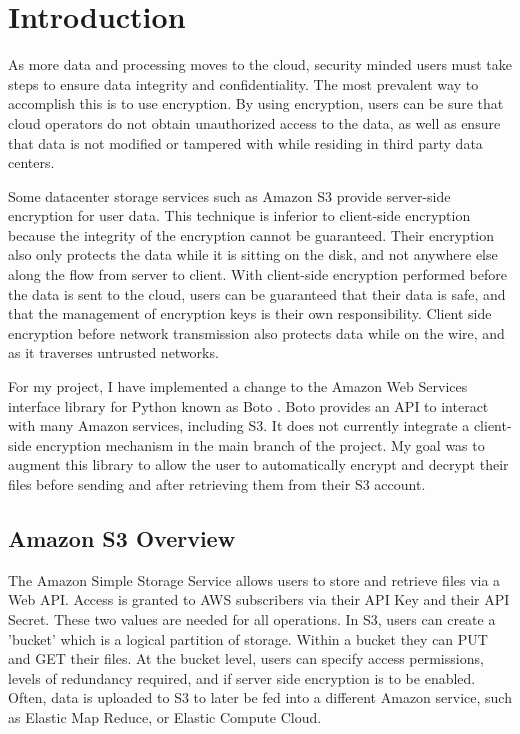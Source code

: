 \section{Introduction}
As more data and processing moves to the cloud, security minded users must take steps to ensure data integrity and confidentiality.
The most prevalent way to accomplish this is to use encryption. 
By using encryption, users can be sure that cloud operators do not
obtain unauthorized access to the data, as well as ensure that data is not modified or tampered with while residing in third party data centers.

Some datacenter storage services such as Amazon S3 \cite{amazons3} provide server-side encryption for user data. This technique is inferior to client-side encryption because the integrity of the encryption cannot be guaranteed.
Their encryption also only protects the data while it is sitting on the disk, and not anywhere else along the flow from server to client.
With client-side encryption performed before the data is sent to the cloud, users can be guaranteed that their data is safe, and that the management of encryption keys is their own responsibility. 
Client side encryption before network transmission also protects data while on the wire, and as it traverses untrusted networks.

For my project, I have implemented a change to the Amazon Web Services interface library for Python known as Boto \cite{boto}. 
Boto provides an API to interact with many Amazon services, including S3. 
It does not currently integrate a client-side encryption mechanism in the main branch of the project. 
My goal was to augment this library to allow the user to automatically encrypt and decrypt their files before sending and 
after retrieving them from their S3 account.

\subsection{Amazon S3 Overview}
The Amazon Simple Storage Service allows users to store and retrieve files via a Web API. Access is granted to AWS subscribers via their API Key and their API Secret. These two values are needed for all operations. In S3, users can create a 'bucket' which is a logical partition of storage. Within a bucket they can PUT and GET their files. At the bucket level, users can specify access permissions, levels of redundancy required, and if server side encryption is to be enabled. Often, data is uploaded to S3 to later be fed into a different Amazon service, such as Elastic Map Reduce, or Elastic Compute Cloud.

